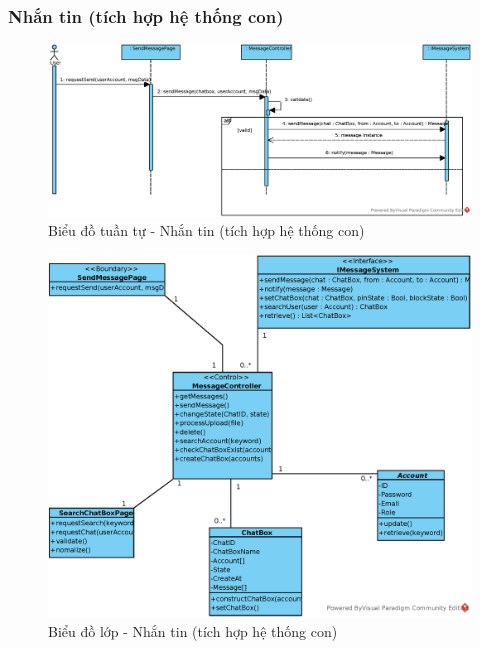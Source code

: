 \documentclass[./../main.tex]{subfiles}
\begin{document}
\subsubsection{Nhắn tin (tích hợp hệ thống con)}
\begin{figure}[H]
	\centering
	\includegraphics[width=\linewidth]{./images/UseCaseDesignDiagram/ucr_ss_message.eps}
	\caption{Biểu đồ tuần tự - Nhắn tin (tích hợp hệ thống con)}
\end{figure}
\begin{figure}[H]
	\centering
	\includegraphics[width=\linewidth]{./images/UseCaseDesignDiagram/ucd_ss_message.eps}
	\caption{Biểu đồ lớp - Nhắn tin (tích hợp hệ thống con)}
\end{figure}
\end{document}
